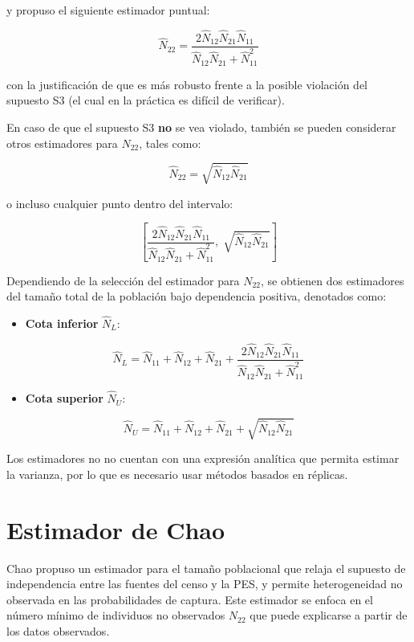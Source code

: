 \documentclass[
  12pt,
]{book}
\providecommand{\tightlist}{%
  \setlength{\itemsep}{0pt}\setlength{\parskip}{0pt}}
\begin{document}
y propuso el siguiente estimador puntual:

\[\hat{N}_{22} = \frac{2 \hat{N}_{12} \hat{N}_{21} \hat{N}_{11}}{\hat{N}_{12} \hat{N}_{21} + \hat{N}_{11}^2}\]

con la justificación de que es más robusto frente a la posible violación del supuesto S3 (el cual en la práctica es difícil de verificar).

En caso de que el supuesto S3 \textbf{no} se vea violado, también se pueden considerar otros estimadores para \(N_{22}\), tales como:

\[\hat{N}_{22} = \sqrt{\hat{N}_{12} \hat{N}_{21}}\]

o incluso cualquier punto dentro del intervalo:

\[\left[ \frac{2 \hat{N}_{12} \hat{N}_{21} \hat{N}_{11}}{\hat{N}_{12} \hat{N}_{21} + \hat{N}_{11}^2}, \; \sqrt{\hat{N}_{12} \hat{N}_{21}} \right]\]

Dependiendo de la selección del estimador para \(N_{22}\), se obtienen dos estimadores del tamaño total de la población bajo dependencia positiva, denotados como:

\begin{itemize}
\tightlist
\item
  \textbf{Cota inferior} \(\hat{N}_L\):
\end{itemize}

\[\hat{N}_L = \hat{N}_{11} + \hat{N}_{12} + \hat{N}_{21} + \frac{2 \hat{N}_{12} \hat{N}_{21} \hat{N}_{11}}{\hat{N}_{12} \hat{N}_{21} + \hat{N}_{11}^2}\]

\begin{itemize}
\tightlist
\item
  \textbf{Cota superior} \(\hat{N}_U\):
\end{itemize}

\[\hat{N}_U = \hat{N}_{11} + \hat{N}_{12} + \hat{N}_{21} + \sqrt{\hat{N}_{12} \hat{N}_{21}}\]

Los estimadores no no cuentan con una expresión analítica que permita estimar la varianza, por lo que es necesario usar métodos basados en réplicas.

\section{Estimador de Chao}\label{estimador-de-chao}

Chao \citep{chao1987, chao1989} propuso un estimador para el tamaño poblacional que relaja el supuesto de independencia entre las fuentes del censo y la PES, y permite heterogeneidad no observada en las probabilidades de captura. Este estimador se enfoca en el número mínimo de individuos no observados \(N_{22}\) que puede explicarse a partir de los datos observados.
\end{document}
